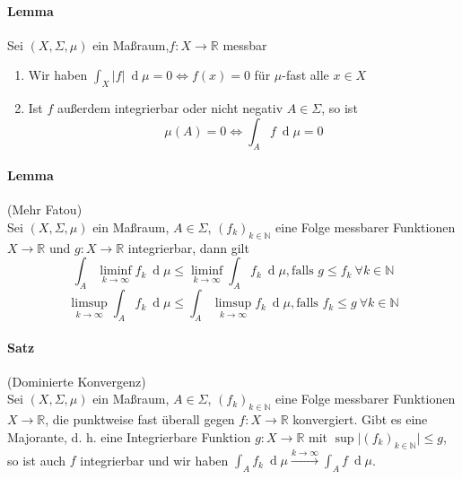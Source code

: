 \documentclass[12pt,a4paper,fleqn]{article}
\def\d{{\operatorname{d}}}
\begin{document}
\paragraph{Lemma} Sei $(X, \Sigma, \mu)$ ein Maßraum,$f\colon X \rightarrow \mathbb{R}$ messbar
\begin{enumerate}
\item Wir haben $\int_X \vert{f}\vert\ \d\mu = 0 \Leftrightarrow f(x) = 0$ für $\mu$-fast alle $x \in X$
\item Ist $f$ außerdem integrierbar oder nicht negativ $A \in \Sigma$, so ist 
\begin{displaymath}
\mu(A) = 0 \Leftrightarrow \int_A f\ \d\mu = 0
\end{displaymath}
\end{enumerate}

\paragraph{Lemma} (Mehr Fatou)\\
Sei $(X, \Sigma, \mu)$ ein Maßraum, $A \in \Sigma$, $(f_k)_{k \in \mathbb{N}}$ eine Folge messbarer Funktionen $X \rightarrow \mathbb{R}$ und $g\colon X \rightarrow \mathbb{R}$ integrierbar, dann gilt
\begin{displaymath}
\int_A \liminf_{k \rightarrow\infty} f_k\ \d\mu \leq \liminf_{k \rightarrow \infty} \int_A f_k\ \d\mu, \text{falls } g \leq f_k\ \forall k \in \mathbb{N}
\end{displaymath}
\begin{displaymath}
\limsup_{k \rightarrow \infty} \int_A f_k\ \d\mu \leq \int_A \limsup_{k \rightarrow \infty} f_k\ \d\mu, \text{falls } f_k \leq g\ \forall k \in \mathbb{N}
\end{displaymath}

\paragraph{Satz} (Dominierte Konvergenz)\\
Sei $(X, \Sigma, \mu)$ ein Maßraum, $A \in \Sigma$, $(f_k)_{k \in \mathbb{N}}$ eine Folge messbarer Funktionen $X \rightarrow \mathbb{R}$, die punktweise fast überall gegen $f\colon X \rightarrow \mathbb{R}$ konvergiert. Gibt es eine Majorante, d. h. eine Integrierbare Funktion $g\colon X \rightarrow \mathbb{R}$ mit $\sup \vert (f_k)_{k \in \mathbb{N}} \vert \leq g$, so ist auch $f$ integrierbar und wir haben $\int_A f_k\ \d\mu \xrightarrow{k \rightarrow \infty} \int_A f\ \d\mu$.
\end{document}
